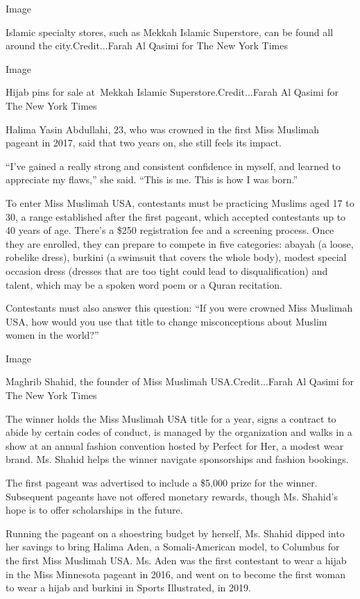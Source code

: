 Image

Islamic specialty stores, such as Mekkah Islamic Superstore, can be
found all around the city.Credit...Farah Al Qasimi for The New York
Times

Image

Hijab pins for sale at~Mekkah Islamic Superstore.Credit...Farah Al
Qasimi for The New York Times

Halima Yasin Abdullahi, 23, who was crowned in the first Miss Muslimah
pageant in 2017, said that two years on, she still feels its impact.

``I've gained a really strong and consistent confidence in myself, and
learned to appreciate my flaws,'' she said. ``This is me. This is how I
was born.''

To enter Miss Muslimah USA, contestants must be practicing Muslims aged
17 to 30, a range established after the first pageant, which accepted
contestants up to 40 years of age. There's a \$250 registration fee and
a screening process. Once they are enrolled, they can prepare to compete
in five categories: abayah (a loose, robelike dress), burkini (a
swimsuit that covers the whole body), modest special occasion dress
(dresses that are too tight could lead to disqualification) and talent,
which may be a spoken word poem or a Quran recitation.

Contestants must also answer this question: ``If you were crowned Miss
Muslimah USA, how would you use that title to change misconceptions
about Muslim women in the world?''

Image

Maghrib Shahid, the founder of Miss Muslimah USA.Credit...Farah Al
Qasimi for The New York Times

The winner holds the Miss Muslimah USA title for a year, signs a
contract to abide by certain codes of conduct, is managed by the
organization and walks in a show at an annual fashion convention hosted
by Perfect for Her, a modest wear brand. Ms. Shahid helps the winner
navigate sponsorships and fashion bookings.

The first pageant was advertised to include a \$5,000 prize for the
winner. Subsequent pageants have not offered monetary rewards, though
Ms. Shahid's hope is to offer scholarships in the future.

Running the pageant on a shoestring budget by herself, Ms. Shahid dipped
into her savings to bring Halima Aden, a Somali-American model, to
Columbus for the first Miss Muslimah USA. Ms. Aden was the first
contestant to wear a hijab in the Miss Minnesota pageant in 2016, and
went on to become the first woman to wear a hijab and burkini in Sports
Illustrated, in 2019.

